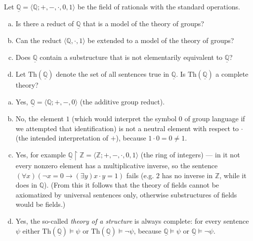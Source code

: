 \begin{problem}

    Let $\underline{\mathbb{Q}}=\langle\mathbb{Q};+,-,\cdot,0,1 \rangle$ be the field of rationals with the standard operations.
    \begin{enumerate}[(a)]                
        \item Is there a reduct of $\underline{\mathbb{Q}}$ that is a model of the theory of groups?
        \item Can the reduct $\langle\mathbb{Q},\cdot,1\rangle$ be extended to a model of the theory of groups?
        \item Does $\underline{\mathbb{Q}}$ contain a substructure that is not elementarily equivalent to $\underline{\mathbb{Q}}$?
        \item Let $\mathrm{Th}(\underline{\mathbb{Q}})$ denote the set of all sentences true in $\underline{\mathbb{Q}}$. Is $\mathrm{Th}(\underline{\mathbb{Q}})$ a complete theory?
    \end{enumerate}

    \begin{solution}

        \begin{enumerate}[(a)]
            \item Yes, $\underline{\mathbb{Q}}=\langle\mathbb{Q};+,-,0\rangle$ (the additive group reduct).
            \item No, the element $1$ (which would interpret the symbol $0$ of group language if we attempted that identification) is not a neutral element with respect to $\cdot$ (the intended interpretation of $+$), because $1\cdot 0=0\neq 1$.
            \item Yes, for example $\underline{\mathbb{Q}}\restriction\mathbb Z =\langle\mathbb{Z};+,-,\cdot,0,1 \rangle$ (the ring of integers) — in it not every nonzero element has a multiplicative inverse, so the sentence $(\forall x)(\neg x=0\to (\exists y)x\cdot y=1)$ fails (e.g. $2$ has no inverse in $\mathbb Z$, while it does in $\mathbb Q$). (From this it follows that the theory of fields cannot be axiomatized by universal sentences only, otherwise substructures of fields would be fields.)
            \item Yes, the so-called \emph{theory of a structure} is always complete: for every sentence $\psi$ either $\mathrm{Th}(\underline{\mathbb{Q}})\models\psi$ or $\mathrm{Th}(\underline{\mathbb{Q}})\models\neg\psi$, because $\underline{\mathbb{Q}}\models\psi$ or $\underline{\mathbb{Q}}\models\neg\psi$.
        \end{enumerate}
                    
    \end{solution}

\end{problem}



